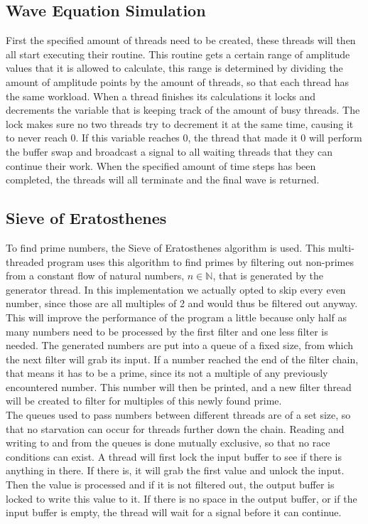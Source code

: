 \documentclass[a4paper,12px]{article}
\begin{document}
\subsection{Wave Equation Simulation}

First the specified amount of threads need to be created, these threads will
then all start executing their routine. This routine gets a certain range of
amplitude values that it is allowed to calculate, this range is determined by
dividing the amount of amplitude points by the amount of threads, so that each
thread has the same workload. When a thread finishes its calculations it locks
and decrements the variable that is keeping track of the amount of busy threads.
The lock makes sure no two threads try to decrement it at the same time, causing
it to never reach 0.  If this variable reaches 0, the thread that made it 0 will
perform the buffer swap and broadcast a signal to all waiting threads that they
can continue their work. When the specified amount of time steps has been
completed, the threads will all terminate and the final wave is returned.

\subsection{Sieve of Eratosthenes}

To find prime numbers, the Sieve of Eratosthenes algorithm is used. This
multi-threaded program uses this algorithm to find primes by filtering out
non-primes from a constant flow of natural numbers, $n \in \mathbb{N}$, that is
generated by the generator thread. In this implementation we actually opted to
skip every even number, since those are all multiples of 2 and would thus be
filtered out anyway. This will improve the performance of the program a little
because only half as many numbers need to be processed by the first filter and
one less filter is needed. The generated numbers are put into a queue of a fixed
size, from which the next filter will grab its input. If a number reached the
end of the filter chain, that means it has to be a prime, since its not a
multiple of any previously encountered number. This number will then be printed,
and a new filter thread will be created to filter for multiples of this newly
found prime.\\
The queues used to pass numbers between different threads are of a set size, so
that no starvation can occur for threads further down the chain. Reading and
writing to and from the queues is done mutually exclusive, so that no race
conditions can exist. A thread will first lock the input buffer to see if there
is anything in there. If there is, it will grab the first value and unlock the
input. Then the value is processed and if it is not filtered out, the output
buffer is locked to write this value to it. If there is no space in the output
buffer, or if the input buffer is empty, the thread will wait for a signal
before it can continue.
\end{document}
